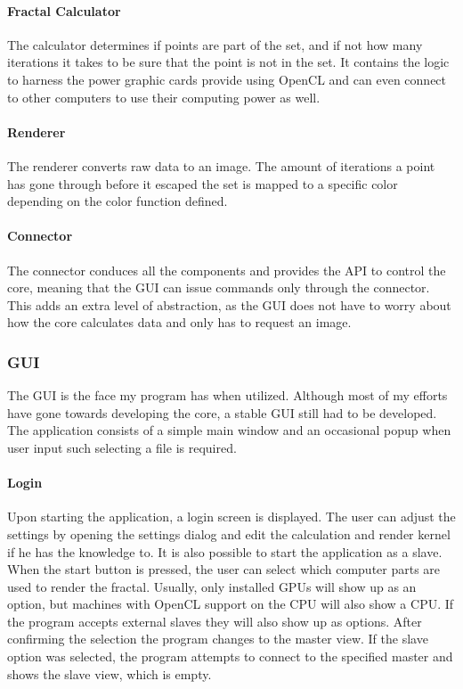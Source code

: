 \documentclass[12pt,a4paper,titlepage]{article}
\begin{document}
	\paragraph{Fractal Calculator}
	The calculator determines if points are part of the set, and if not how many iterations it takes to be sure that the point is not in the set. It contains the logic to harness the power graphic cards provide using OpenCL and can even connect to other computers to use their computing power as well.
	\paragraph{Renderer}
	The renderer converts raw data to an image. The amount of iterations a point has gone through before it escaped the set is mapped to a specific color depending on the color function defined.
	\paragraph{Connector}
	The connector conduces all the components and provides the API to control the core, meaning that the GUI can issue commands only through the connector. This adds an extra level of abstraction, as the GUI does not have to worry about how the core calculates data and only has to request an image. 
	\subsubsection{GUI}
	The GUI is the face my program has when utilized. Although most of my efforts have gone towards developing the core, a stable GUI still had to be developed. The application consists of a simple main window and an occasional popup when user input such selecting a file is required.
	\paragraph{Login}
	Upon starting the application, a login screen is displayed. The user can adjust the settings by opening the settings dialog and edit the calculation and render kernel if he has the knowledge to. It is also possible to start the application as a slave.\\
	When the start button is pressed, the user can select which computer parts are used to render the fractal. Usually, only installed GPUs will show up as an option, but machines with OpenCL support on the CPU will also show a CPU. If the program accepts external slaves they will also show up as options. After confirming the selection the program changes to the master view. If the slave option was selected, the program attempts to connect to the specified master and shows the slave view, which is empty.
\end{document}
